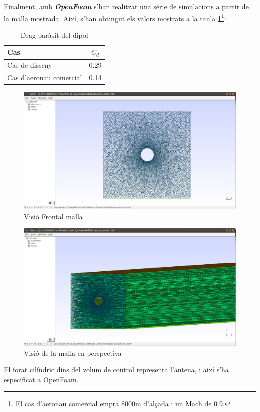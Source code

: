 Finalment, amb \textit{\textbf{OpenFoam}} s'han realitzat una sèrie de simulacions a partir de la malla mostrada. Així, s'han obtingut els valors mostrats a la taula \ref{C_opti2}\footnote{El cas d'aeronau comercial empra 8000m d'alçada i un Mach de 0.9.}:
\begin{table}[H]
	\centering
	\begin{tabular}{lc}
		\toprule[3pt]
		\textbf{Cas}&\textbf{$C_d$}\\
		\midrule[1pt]
		Cas de disseny & 0.29 \\
		Cas d'aeronau comercial & 0.14 \\
		\bottomrule[2pt]
	\end{tabular}
	\caption{Drag paràsit del dipol}
	\label{C_opti2}
\end{table}
\begin{figure}[H]
	\centering
	\includegraphics[width=\textwidth]{./images/malla1.pdf}
	\caption{Visió Frontal malla}
	\label{malla1}
\end{figure}
\begin{figure}[H]
	\centering
	\includegraphics[width=\textwidth]{./images/malla2.pdf}
	\caption{Visió de la malla en perspectiva}
	\label{malla2}
\end{figure}
El forat cilíndric dins del volum de control representa l'antena, i així s'ha especificat a OpenFoam.